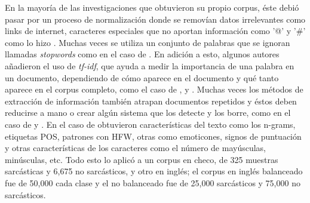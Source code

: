\par En la mayoría de las investigaciones que obtuvieron su propio corpus, éste debió pasar por un proceso de normalización donde se removían datos irrelevantes como links de internet, caracteres especiales que no aportan información como '@' y '\#' como lo hizo \textcite{lopez2016character}. Muchas veces se utiliza un conjunto de palabras que se ignoran llamadas \textit{\gls{stopwords}} como en el caso de \textcite{reyes2012making}. En adición a esto, algunos autores añadieron el uso de \textit{\gls{tf-idf}}, que ayuda a medir la importancia de una palabra en un documento, dependiendo de cómo aparece en el documento y qué tanto aparece en el corpus completo, como el caso de \textcite{reyes2012making}, \textcite{wallace2015sparse} y \textcite{bamman2015contextualized}. Muchas veces los métodos de extracción de información también atrapan documentos repetidos y éstos deben reducirse a mano o crear algún sistema que los detecte y los borre, como en el caso de \textcite{charalampakis2015detecting} y \textcite{reyes2012making}. En el caso de \textcite{ptavcek2014sarcasm} obtuvieron características del texto como los \gls{n-grams}, etiquetas \gls{POS}, patrones con \gls{HFW}, otras como emoticones, signos de puntuación y otras características de los caracteres como el número de mayúsculas, minúsculas, etc. Todo esto lo aplicó a un corpus en checo, de 325 muestras sarcásticas y 6,675 no sarcásticos, y otro en inglés; el corpus en inglés balanceado fue de 50,000 cada clase y el no balanceado fue de 25,000 sarcásticos y 75,000 no sarcásticos.
